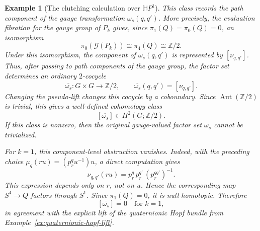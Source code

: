 \documentclass[11pt,a4paper]{article}
\numberwithin{equation}{section}
\newtheorem{example}[definition]{Example}
\theoremstyle{named}
\begin{document}
\begin{example}[The clutching calculation over \(\mathbb H P^1\)]
This class records the path component of the gauge transformation \(\omega_s(q,q')\). More precisely, the evaluation fibration for the gauge group of \(P_k\) gives, since \(\pi_1(Q)=\pi_0(Q)=0\), an isomorphism 
\[\pi_0(\mathcal G(P_k))\cong \pi_4(Q)\cong\mathbb Z/2.
\]
Under this isomorphism, the component of \(\omega_s(q,q')\) is represented by \([\nu_{q,q'}]\). Thus, after passing to path components of the gauge group, the factor set determines an ordinary \(2\)-cocycle
\[
\overline{\omega_s}:G\times G\longrightarrow \mathbb Z/2, \qquad \overline{\omega_s}(q,q')=[\nu_{q,q'}].
\]
Changing the pseudo-lift changes this cocycle by a coboundary. Since \(\operatorname{Aut}(\mathbb Z/2)\) is trivial, this gives a well-defined cohomology class
\[
[\overline{\omega_s}]\in H^2(G;\mathbb Z/2).
\]
If this class is nonzero, then the original gauge-valued factor set \(\omega_s\) cannot be trivialized.

For \(k=1\), this component-level obstruction vanishes. Indeed, with the preceding choice $\mu_q(ru)=(p^q_r u^{-1})u$,
a direct computation gives
\[
\nu_{q,q'}(ru)=p^q_r\,p^{q'}_r\,(p^{qq'}_r)^{-1}.
\]
This expression depends only on \(r\), not on \(u\). Hence the corresponding map \(S^4\to Q\) factors through \(S^1\). Since \(\pi_1(Q)=0\), it is null-homotopic. Therefore
\[
[\overline{\omega_s}]=0
\quad\text{for }k=1,
\]
in agreement with the explicit lift of the quaternionic Hopf bundle from Example~\ref{ex:quaternionic-hopf-lift}.
\end{example}
\end{document}
